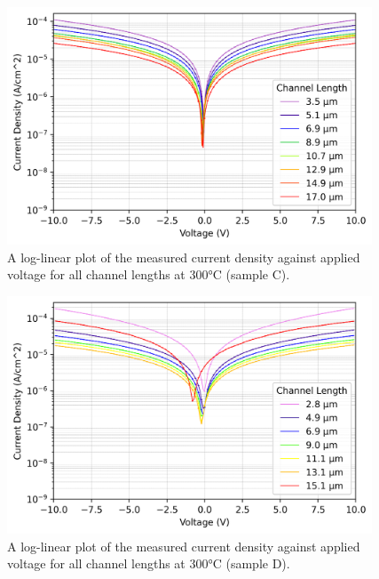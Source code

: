 \begin{figure}[h]
    \centering
    \includegraphics[width=0.97\textwidth]{Sample C 2019/10V_Current_Density_vs_Voltage_Temperature_300_log.png}
    \caption{A log-linear plot of the measured current density against applied voltage for all channel lengths at 300\si{\degreeCelsius} (sample C).}
    \label{fig:10V_current_density_300_C}
\end{figure}
\begin{figure}[h]
    \centering
    \includegraphics[width=0.97\textwidth]{Sample D 2019/10V_Current_Density_vs_Voltage_Temperature_300_log.png}
    \caption{A log-linear plot of the measured current density against applied voltage for all channel lengths at 300\si{\degreeCelsius} (sample D).}
    \label{fig:10V_current_density_300_D}
\end{figure}

\FloatBarrier

